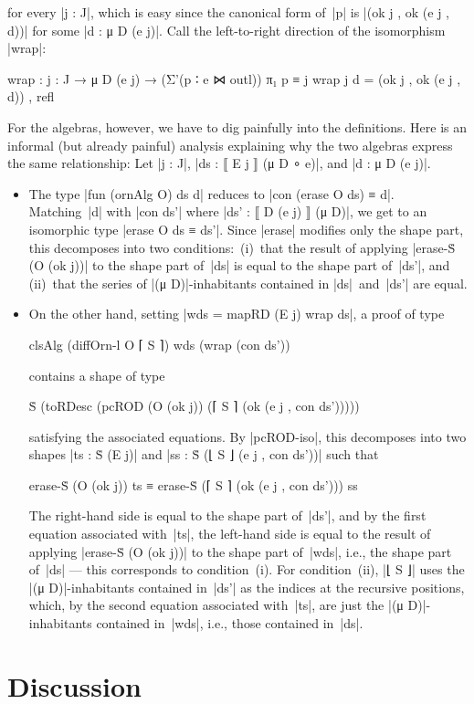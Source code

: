 for every |j : J|, which is easy since the canonical form of~|p| is |(ok j , ok (e j , d))| for some |d : μ D (e j)|.
Call the left-to-right direction of the isomorphism |wrap|:
\begin{code}
wrap : {j : J} → μ D (e j) → (Σ'(p ∶ e ⋈ outl)) π₁ p ≡ j
wrap {j} d = (ok j , ok (e j , d)) , refl
\end{code}
For the algebras, however, we have to dig painfully into the definitions.
Here is an informal (but already painful) analysis explaining why the two algebras express the same relationship:
Let |j : J|, |ds : ⟦ E j ⟧ (μ D ∘ e)|, and |d : μ D (e j)|.
\begin{itemize}
\item The type |fun (ornAlg O) ds d| reduces to |con (erase O ds) ≡ d|.
Matching~|d| with |con ds'| where |ds' : ⟦ D (e j) ⟧ (μ D)|, we get to an isomorphic type |erase O ds ≡ ds'|.
Since |erase| modifies only the shape part, this decomposes into two conditions: \,(i)~that the result of applying |erase-Ṡ (O (ok j))| to the shape part of~|ds| is equal to the shape part of~|ds'|, and \,(ii)~that the series of |(μ D)|-inhabitants contained in |ds|~and~|ds'| are equal.
\item On the other hand, setting |wds = mapRD (E j) wrap ds|, a proof of type
\begin{code}
clsAlg (diffOrn-l O ⌈ S ⌉) wds (wrap (con ds'))
\end{code}
contains a shape of type
\begin{code}
Ṡ (toRDesc (pcROD (O (ok j)) (⌈ S ⌉ (ok (e j , con ds')))))
\end{code}
satisfying the associated equations.
By |pcROD-iso|, this decomposes into two shapes |ts : Ṡ (E j)| and |ss : Ṡ (⌊ S ⌋ (e j , con ds'))| such that
\begin{code}
erase-Ṡ (O (ok j)) ts ≡ erase-Ṡ (⌈ S ⌉ (ok (e j , con ds'))) ss
\end{code}
The right-hand side is equal to the shape part of~|ds'|, and by the first equation associated with~|ts|, the left-hand side is equal to the result of applying |erase-Ṡ (O (ok j))| to the shape part of~|wds|, i.e., the shape part of~|ds| --- this corresponds to condition~(i).
For condition~(ii), |⌊ S ⌋| uses the |(μ D)|-inhabitants contained in~|ds'| as the indices at the recursive positions, which, by the second equation associated with~|ts|, are just the |(μ D)|-inhabitants contained in~|wds|, i.e., those contained in~|ds|.
\end{itemize}


\section{Discussion}
\label{sec:equivalence-discussion}

